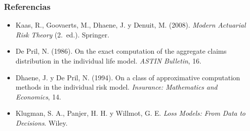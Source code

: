 \documentclass[a4paper,12pt]{article}
\begin{document}
\subsubsection*{Referencias}
\begin{itemize}[leftmargin=*,itemsep=0pt]
\item Kaas, R., Goovaerts, M., Dhaene, J. y Denuit, M. (2008). \emph{Modern Actuarial Risk Theory} (2.\textordfeminine\ ed.). Springer.
\item De Pril, N. (1986). On the exact computation of the aggregate claims distribution in the individual life model. \emph{ASTIN Bulletin}, 16.
\item Dhaene, J. y De Pril, N. (1994). On a class of approximative computation methods in the individual risk model. \emph{Insurance: Mathematics and Economics}, 14.
\item Klugman, S. A., Panjer, H. H. y Willmot, G. E. \emph{Loss Models: From Data to Decisions}. Wiley.
\end{itemize}
\end{document}
